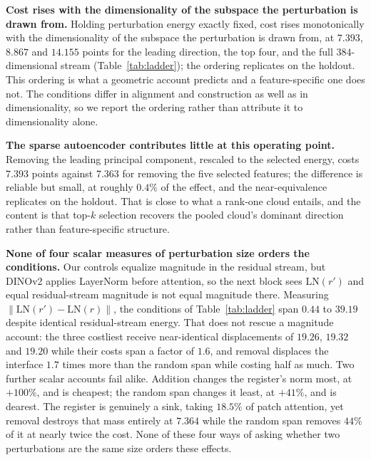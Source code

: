 \documentclass{article}
\begin{document}
\textbf{Cost rises with the dimensionality of the subspace the perturbation is drawn from.} Holding perturbation energy exactly fixed, cost rises monotonically with the dimensionality of the subspace the perturbation is drawn from, at $7.393$, $8.867$ and $14.155$ points for the leading direction, the top four, and the full $384$-dimensional stream (Table~\ref{tab:ladder}); the ordering replicates on the holdout. This ordering is what a geometric account predicts and a feature-specific one does not. The conditions differ in alignment and construction as well as in dimensionality, so we report the ordering rather than attribute it to dimensionality alone.

\textbf{The sparse autoencoder contributes little at this operating point.} Removing the leading principal component, rescaled to the selected energy, costs $7.393$ points against $7.363$ for removing the five selected features; the difference is reliable but small, at roughly $0.4\%$ of the effect, and the near-equivalence replicates on the holdout. That is close to what a rank-one cloud entails, and the content is that top-$k$ selection recovers the pooled cloud's dominant direction rather than feature-specific structure.

\textbf{None of four scalar measures of perturbation size orders the conditions.} Our controls equalize magnitude in the residual stream, but DINOv2 applies LayerNorm before attention, so the next block sees $\mathrm{LN}(r')$ and equal residual-stream magnitude is not equal magnitude there. Measuring $\|\mathrm{LN}(r')-\mathrm{LN}(r)\|$, the conditions of Table~\ref{tab:ladder} span $0.44$ to $39.19$ despite identical residual-stream energy. That does not rescue a magnitude account: the three costliest receive near-identical displacements of $19.26$, $19.32$ and $19.20$ while their costs span a factor of $1.6$, and removal displaces the interface $1.7$ times more than the random span while costing half as much. Two further scalar accounts fail alike. Addition changes the register's norm most, at $+100\%$, and is cheapest; the random span changes it least, at $+41\%$, and is dearest. The register is genuinely a sink, taking $18.5\%$ of patch attention, yet removal destroys that mass entirely at $7.364$ while the random span removes $44\%$ of it at nearly twice the cost. None of these four ways of asking whether two perturbations are the same size orders these effects.
\end{document}

